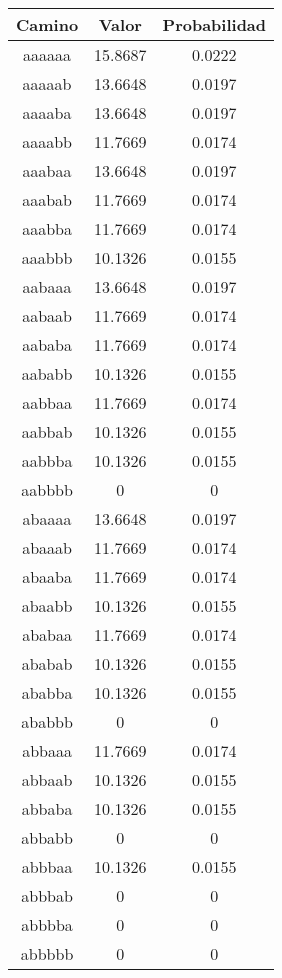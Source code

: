 \begin{figure}[hbpt]
\begin{minipage}{0.48\textwidth}
\begin{center}
\begin{tabular}{|c|c|c|}
\hline
\textbf{Camino} & \textbf{Valor} & \textbf{Probabilidad} \\
\hline
aaaaaa  &  15.8687  &  0.0222  \\
aaaaab  &  13.6648  &  0.0197  \\
aaaaba  &  13.6648  &  0.0197  \\
aaaabb  &  11.7669  &  0.0174  \\
aaabaa  &  13.6648  &  0.0197  \\
aaabab  &  11.7669  &  0.0174  \\
aaabba  &  11.7669  &  0.0174  \\
aaabbb  &  10.1326  &  0.0155  \\
aabaaa  &  13.6648  &  0.0197  \\
aabaab  &  11.7669  &  0.0174  \\
aababa  &  11.7669  &  0.0174  \\
aababb  &  10.1326  &  0.0155  \\
aabbaa  &  11.7669  &  0.0174  \\
aabbab  &  10.1326  &  0.0155  \\
aabbba  &  10.1326  &  0.0155  \\
aabbbb  & 0 & 0 \\
abaaaa  &  13.6648  &  0.0197  \\
abaaab  &  11.7669  &  0.0174  \\
abaaba  &  11.7669  &  0.0174  \\
abaabb  &  10.1326  &  0.0155  \\
ababaa  &  11.7669  &  0.0174  \\
ababab  &  10.1326  &  0.0155  \\
ababba  &  10.1326  &  0.0155  \\
ababbb  & 0 & 0 \\
abbaaa  &  11.7669  &  0.0174  \\
abbaab  &  10.1326  &  0.0155  \\
abbaba  &  10.1326  &  0.0155  \\
abbabb  & 0 & 0 \\
abbbaa  &  10.1326  &  0.0155  \\
abbbab  & 0 & 0 \\
abbbba  & 0 & 0 \\
abbbbb  & 0 & 0 \\

\end{tabular}
\end{center}
\end{minipage}
\end{figure}
